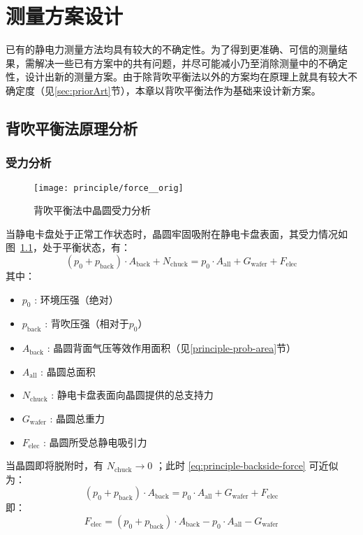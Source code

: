 \cleardoublepage
\chapter{测量方案设计}\label{ch:principle}

已有的静电力测量方法均具有较大的不确定性。为了得到更准确、可信的测量结果，需解决一些已有方案中的共有问题，并尽可能减小乃至消除测量中的不确定性，设计出新的测量方案。由于除背吹平衡法以外的方案均在原理上就具有较大不确定度（见\ref{sec:priorArt}节），本章以背吹平衡法作为基础来设计新方案。



\section{背吹平衡法原理分析}\label{sec:principle-backside}


\subsection{受力分析}\label{sec:principle-backside-force}

\begin{figure}[tbh]
\centering
\texttt{[image: principle/force\_\_orig]}
\caption{背吹平衡法中晶圆受力分析}
\label{fig:principle-backside-force}
\end{figure}

当静电卡盘处于正常工作状态时，晶圆牢固吸附在静电卡盘表面，其受力情况如图~\ref{fig:principle-backside-force}，处于平衡状态，有：
\begin{equation}
\label{eq:principle-backside-force}
(p_{0} + p_{\mathrm{back}}) \cdot A_{\mathrm{back}} + N_{\mathrm{chuck}} = p_0 \cdot A_{\mathrm{all}} + G_{\mathrm{wafer}} + F_{\mathrm{elec}}
\end{equation}
其中：
\begin{itemize}
  \item $p_{0}$ : 环境压强（绝对）
  \item $p_{\mathrm{back}}$  : 背吹压强（相对于$p_{0}$）
  \item $A_{\mathrm{back}}$  : 晶圆背面气压等效作用面积（见\ref{principle-prob-area}节）
  \item $A_{\mathrm{all}}$   : 晶圆总面积
  \item $N_{\mathrm{chuck}}$ : 静电卡盘表面向晶圆提供的总支持力
  \item $G_{\mathrm{wafer}}$ : 晶圆总重力
  \item $F_{\mathrm{elec}}$  : 晶圆所受总静电吸引力
\end{itemize}
当晶圆即将脱附时，有 $N_{\mathrm{chuck}} \to 0$ ；此时 \eqref{eq:principle-backside-force} 可近似为：
\[
(p_{0} + p_{\mathrm{back}}) \cdot A_{\mathrm{back}} = p_0 \cdot A_{\mathrm{all}} + G_{\mathrm{wafer}} + F_{\mathrm{elec}}
\]
即：
\begin{equation}
\label{eq:principle-backside-force-derived}
F_{\mathrm{elec}} = (p_{0} + p_{\mathrm{back}}) \cdot A_{\mathrm{back}} - p_0 \cdot A_{\mathrm{all}} - G_{\mathrm{wafer}}
\end{equation}

